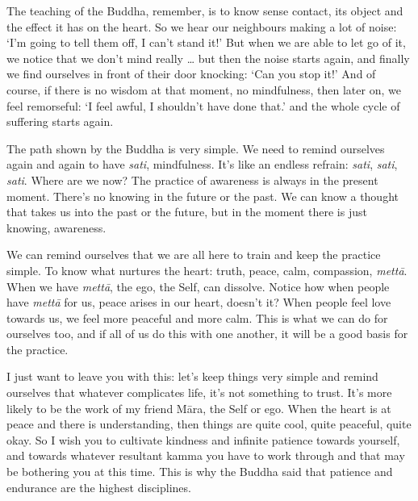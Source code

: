 The teaching of the Buddha, remember, is to know sense contact, its object and the effect it has on the heart. So we hear our neighbours making a lot of noise: `I'm going to tell them off, I can't stand it!' But when we are able to let go of it, we notice that we don't mind really \ldots{} but then the noise starts again, and finally we find ourselves in front of their door knocking: `Can you stop it!' And of course, if there is no wisdom at that moment, no mindfulness, then later on, we feel remorseful: `I feel awful, I shouldn't have done that.' and the whole cycle of suffering starts again.

The path shown by the Buddha is very simple. We need to remind ourselves again and again to have \textit{sati}, mindfulness. It's like an endless refrain: \textit{sati}, \textit{sati}, \textit{sati}. Where are we now? The practice of awareness is always in the present moment. There's no knowing in the future or the past. We can know a thought that takes us into the past or the future, but in the moment there is just knowing, awareness.

We can remind ourselves that we are all here to train and keep the practice simple. To know what nurtures the heart: truth, peace, calm, compassion, \textit{mett\=a}. When we have \textit{mett\=a}, the ego, the Self, can dissolve. Notice how when people have \textit{mett\=a} for us, peace arises in our heart, doesn't it? When people feel love towards us, we feel more peaceful and more calm. This is what we can do for ourselves too, and if all of us do this with one another, it will be a good basis for the practice.

I just want to leave you with this: let's keep things very simple and remind ourselves that whatever complicates life, it's not something to trust. It's more likely to be the work of my friend M\=ara, the Self or ego. When the heart is at peace and there is understanding, then things are quite cool, quite peaceful, quite okay. So I wish you to cultivate kindness and infinite patience towards yourself, and towards whatever resultant kamma you have to work through and that may be bothering you at this time. This is why the Buddha said that patience and endurance are the highest disciplines.

